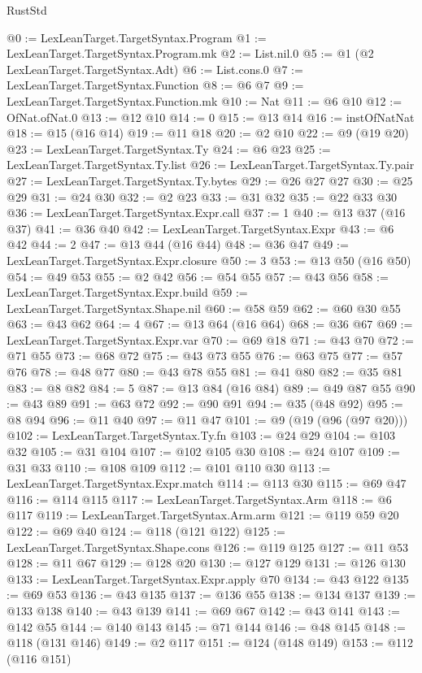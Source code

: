 \begin{lexlean}{RustStd}
\begin{coremodule}
{\begin{coremodule}
{{{{{{{{{{{{{{{{{{{{{{{{{{{{{{{@0 := LexLeanTarget.TargetSyntax.Program
@1 := LexLeanTarget.TargetSyntax.Program.mk
@2 := List.nil.{0}
@5 := @1 (@2 LexLeanTarget.TargetSyntax.Adt)
@6 := List.cons.{0}
@7 := LexLeanTarget.TargetSyntax.Function
@8 := @6 @7
@9 := LexLeanTarget.TargetSyntax.Function.mk
@10 := Nat
@11 := @6 @10
@12 := OfNat.ofNat.{0}
@13 := @12 @10
@14 := 0
@15 := @13 @14
@16 := instOfNatNat
@18 := @15 (@16 @14)
@19 := @11 @18
@20 := @2 @10
@22 := @9 (@19 @20)
@23 := LexLeanTarget.TargetSyntax.Ty
@24 := @6 @23
@25 := LexLeanTarget.TargetSyntax.Ty.list
@26 := LexLeanTarget.TargetSyntax.Ty.pair
@27 := LexLeanTarget.TargetSyntax.Ty.bytes
@29 := @26 @27 @27
@30 := @25 @29
@31 := @24 @30
@32 := @2 @23
@33 := @31 @32
@35 := @22 @33 @30
@36 := LexLeanTarget.TargetSyntax.Expr.call
@37 := 1
@40 := @13 @37 (@16 @37)
@41 := @36 @40
@42 := LexLeanTarget.TargetSyntax.Expr
@43 := @6 @42
@44 := 2
@47 := @13 @44 (@16 @44)
@48 := @36 @47
@49 := LexLeanTarget.TargetSyntax.Expr.closure
@50 := 3
@53 := @13 @50 (@16 @50)
@54 := @49 @53
@55 := @2 @42
@56 := @54 @55
@57 := @43 @56
@58 := LexLeanTarget.TargetSyntax.Expr.build
@59 := LexLeanTarget.TargetSyntax.Shape.nil
@60 := @58 @59
@62 := @60 @30 @55
@63 := @43 @62
@64 := 4
@67 := @13 @64 (@16 @64)
@68 := @36 @67
@69 := LexLeanTarget.TargetSyntax.Expr.var
@70 := @69 @18
@71 := @43 @70
@72 := @71 @55
@73 := @68 @72
@75 := @43 @73 @55
@76 := @63 @75
@77 := @57 @76
@78 := @48 @77
@80 := @43 @78 @55
@81 := @41 @80
@82 := @35 @81
@83 := @8 @82
@84 := 5
@87 := @13 @84 (@16 @84)
@89 := @49 @87 @55
@90 := @43 @89
@91 := @63 @72
@92 := @90 @91
@94 := @35 (@48 @92)
@95 := @8 @94
@96 := @11 @40
@97 := @11 @47
@101 := @9 (@19 (@96 (@97 @20)))
@102 := LexLeanTarget.TargetSyntax.Ty.fn
@103 := @24 @29
@104 := @103 @32
@105 := @31 @104
@107 := @102 @105 @30
@108 := @24 @107
@109 := @31 @33
@110 := @108 @109
@112 := @101 @110 @30
@113 := LexLeanTarget.TargetSyntax.Expr.match
@114 := @113 @30
@115 := @69 @47
@116 := @114 @115
@117 := LexLeanTarget.TargetSyntax.Arm
@118 := @6 @117
@119 := LexLeanTarget.TargetSyntax.Arm.arm
@121 := @119 @59 @20
@122 := @69 @40
@124 := @118 (@121 @122)
@125 := LexLeanTarget.TargetSyntax.Shape.cons
@126 := @119 @125
@127 := @11 @53
@128 := @11 @67
@129 := @128 @20
@130 := @127 @129
@131 := @126 @130
@133 := LexLeanTarget.TargetSyntax.Expr.apply @70
@134 := @43 @122
@135 := @69 @53
@136 := @43 @135
@137 := @136 @55
@138 := @134 @137
@139 := @133 @138
@140 := @43 @139
@141 := @69 @67
@142 := @43 @141
@143 := @142 @55
@144 := @140 @143
@145 := @71 @144
@146 := @48 @145
@148 := @118 (@131 @146)
@149 := @2 @117
@151 := @124 (@148 @149)
@153 := @112 (@116 @151)
}}}}}}}}}}}}}}}}}}}}}}}}}}}}}}}
\end{coremodule}}
\end{coremodule}
\end{lexlean}
